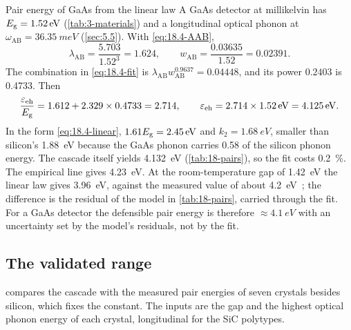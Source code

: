 \begin{workedexample}{Pair energy of GaAs from the linear law}\label{we:18-gaas}
A GaAs detector at millikelvin has $E_{\mathrm{g}} = \SI{1.52}{eV}$ (\cref{tab:3-materials}) and a longitudinal optical phonon at $\omega_{\mathrm{AB}} = \SI{36.35}{meV}$ (\cref{sec:5.5}). With \cref{eq:18.4-AAB},
\begin{equation*}
  \lambda_{\mathrm{AB}} = \frac{5.703}{1.52^3} = 1.624, \qquad w_{\mathrm{AB}} = \frac{0.03635}{1.52} = 0.02391 .
\end{equation*}
The combination in \cref{eq:18.4-fit} is $\lambda_{\mathrm{AB}}w_{\mathrm{AB}}^{0.9637} = 0.04448$, and its power $0.2403$ is 0.4733. Then
\begin{equation*}
  \frac{\varepsilon_{\mathrm{eh}}}{E_{\mathrm{g}}} = 1.612 + 2.329\times0.4733 = 2.714, \qquad
  \varepsilon_{\mathrm{eh}} = 2.714\times\SI{1.52}{eV} = \SI{4.125}{eV} .
\end{equation*}
In the form \cref{eq:18.4-linear}, $1.61E_{\mathrm{g}} = \SI{2.45}{eV}$ and $k_2 = \SI{1.68}{eV}$, smaller than silicon's \SI{1.88}{eV} because the GaAs phonon carries 0.58 of the silicon phonon energy. The cascade itself yields \SI{4.132}{eV} (\cref{tab:18-pairs}), so the fit costs \SI{0.2}{\percent}. The empirical line gives \SI{4.23}{eV}. At the room-temperature gap of \SI{1.42}{eV} the linear law gives \SI{3.96}{eV}, against the measured value of about \SI{4.2}{eV}~\cite[Fig.~1]{nielsen2026first}; the difference is the residual of the model in \cref{tab:18-pairs}, carried through the fit. For a GaAs detector the defensible pair energy is therefore $\approx\SI{4.1}{eV}$ with an uncertainty set by the model's residuals, not by the fit.
\end{workedexample}

\subsection{The validated range}\label{sec:18.4-range}

 compares the cascade with the measured pair energies of seven crystals besides silicon, which fixes the constant. The inputs are the gap and the highest optical phonon energy of each crystal, longitudinal for the SiC polytypes.

